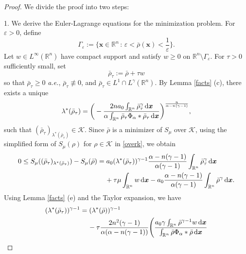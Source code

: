 \documentclass[reqno,11pt]{amsart}
\numberwithin{equation}{section}
\theoremstyle{definition}
\def\dd{{\, \rm d}}
\begin{document}
\begin{proof} We divide the proof into two steps:
 
\bigskip\noindent
{1.} We derive the Euler-Lagrange equations for the minimization problem. 
For $\varepsilon > 0$, define
    \[\Gamma_\varepsilon := \big\{ \boldsymbol{x} \in \mathbb{R}^n \, : \, \varepsilon < \bar{\rho}(\boldsymbol{x}) < \frac{1}{\varepsilon} \big\}.
    \]
Let $w \in L^\infty(\mathbb{R}^n)$ have compact support and satisfy $w\ge 0$ 
on $\mathbb{R}^n \setminus \Gamma_\varepsilon$. 
For $\tau > 0$ sufficiently small, set  
    \[
    \bar{\rho}_\tau := \bar{\rho} + \tau w
    \]
so that $\bar{\rho}_\tau \geq 0$ {\it a.e.}, 
    $\bar{\rho}_\tau \not \equiv 0$, and 
    $\bar{\rho}_\tau \in L^1 \cap L^\gamma (\mathbb{R}^n)$.
    By Lemma \ref{facts} (c), there exists a unique
    \[
 \lambda^*(\bar{\rho}_\tau) = \bigg ( -\frac{2na_0 \int_{\mathbb{R}^n} \bar{\rho}_\tau^\gamma \dd \boldsymbol{x}}{\alpha \int_{\mathbb{R}^n} \bar{\rho}_\tau \Phi_\alpha * \bar{\rho}_\tau \dd \boldsymbol{x}} \bigg )^\frac{n}{\alpha - n(\gamma - 1)},
    \]
    such that $(\bar{\rho}_\tau)_{\lambda^*(\bar{\rho}_\tau)} \in \mathcal{K}$. 
Since $\bar{\rho}$ is a minimizer of $S_\mu$ over $\mathcal{K}$, 
using the simplified form of $S_\mu(\rho)$ for $\rho \in \mathcal{K}$ in \eqref{overk},
we obtain
    \begin{align}\label{comparemin}
 \begin{split}
  0 \leq S_\mu((\bar{\rho}_\tau)_{\lambda^*(\bar{\rho}_\tau)}) - S_\mu(\bar{\rho})
 & = a_0(\lambda^*(\bar{\rho}_\tau))^{\gamma - 1} \frac{\alpha - n(\gamma - 1)}{\alpha(\gamma - 1)}\int_{\mathbb{R}^n} \bar{\rho}_\tau^\gamma \dd \boldsymbol{x} \\
  & \quad\, + \tau \mu \int_{\mathbb{R}^n} w \dd \boldsymbol{x}
 - a_0 \frac{\alpha - n(\gamma - 1)}{\alpha(\gamma - 1)}\int_{\mathbb{R}^n} \bar{\rho}^\gamma \dd \boldsymbol{x}.
  \end{split}
    \end{align}
Using
Lemma \ref{facts} (e) and the Taylor expansion, 
we have
    \begin{align*}
  \begin{split}
      (\lambda^*(\bar{\rho}_\tau))^{\gamma - 1}
 & = (\lambda^*(\bar{\rho}))^{\gamma - 1} \\
 &\quad\,- \tau \frac{2n^2(\gamma - 1)}{\alpha(\alpha - n(\gamma - 1))} \Bigg ( \frac{a_0 \gamma \int_{\mathbb{R}^n} \bar{\rho}^{\gamma - 1} w \dd \boldsymbol{x}}{\int_{\mathbb{R}^n} \bar{\rho} \Phi_\alpha * \bar{\rho} \dd \boldsymbol{x}} 

\end{split}
\end{align*}
\end{proof}
\end{document}
